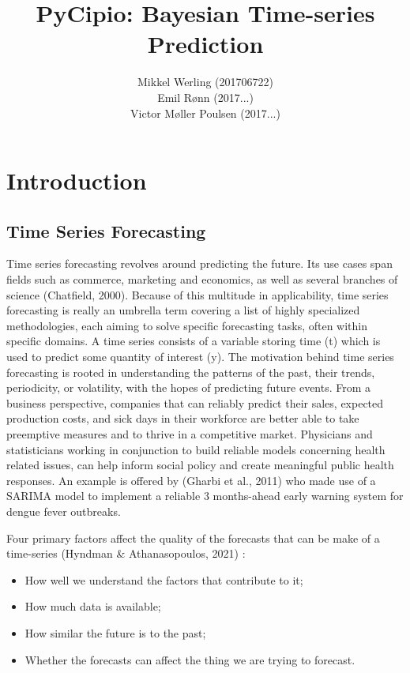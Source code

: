 \documentclass{article}
\title{PyCipio: Bayesian Time-series Prediction}
\author{Mikkel Werling (201706722) \\
    Emil Rønn (2017...) \\
    Victor Møller Poulsen (2017...)}
\date{}
\begin{document}
\maketitle
\section{Introduction}
\subsection{Time Series Forecasting}

Time series forecasting revolves around predicting the future. Its use cases span fields such as commerce, marketing and economics, as well as several branches of science (Chatfield, 2000). Because of this multitude in applicability, time series forecasting is really an umbrella term covering a list of highly specialized methodologies, each aiming to solve specific forecasting tasks, often within specific domains. A time series consists of a variable storing time (t) which is used to predict some quantity of interest (y). The motivation behind time series forecasting is rooted in understanding the patterns of the past, their trends, periodicity, or volatility, with the hopes of predicting future events. From a business perspective, companies that can reliably predict their sales, expected production costs, and sick days in their workforce are better able to take preemptive measures and to thrive in a competitive market. Physicians and statisticians working in conjunction to build reliable models concerning health related issues, can help inform social policy and create meaningful public health responses. An example is offered by (Gharbi et al., 2011) who made use of a SARIMA model to implement a reliable 3 months-ahead early warning system for dengue fever outbreaks.

Four primary factors affect the quality of the forecasts that can be make of a time-series \cite{RefWorks:doc:60acde858f087d14ab41da1a}(Hyndman \& Athanasopoulos, 2021) :

\begin{itemize}
    \item How well we understand the factors that contribute to it;
    \item How much data is available;
    \item How similar the future is to the past;
    \item Whether the forecasts can affect the thing we are trying to forecast.
\end{itemize}
\end{document}
